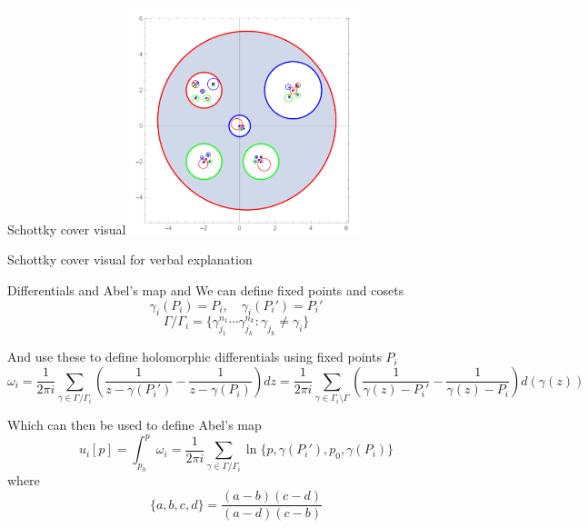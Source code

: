 \documentclass[11pt,aspectratio=169]{beamer}
\begin{document}
\begin{frame}[noframenumbering]{Schottky cover visual}{\tiny \cite{Cha22}}
    \center{}
    \includegraphics[width=0.5\textwidth]{assets/ChanSchottkyCover2.png}

    \tiny Schottky cover visual for verbal explanation

    \cite{Cha22}
\end{frame}

\begin{frame}{Differentials and Abel's map}{\tiny \cite{ComputationalSchottky} and \cite{Cha22}}
    We can define fixed points and cosets
    \[\gamma_i(P_i)=P_i, \quad \gamma_i(P_i')=P_i'\]
    \[\Gamma / \Gamma_i = \{\gamma_{j_1}^{n_1}\cdots \gamma_{j_k}^{n_k}: \gamma_{j_k} \neq \gamma_i\}\]
    
    
    And use these to define holomorphic differentials using fixed points $P_i$
    \[\omega_i = \frac{1}{2\pi i}\sum_{\gamma \in \Gamma / \Gamma_i} \left(\frac{1}{z-\gamma(P_i')} - \frac{1}{z-\gamma(P_i)}\right)dz = \frac{1}{2\pi i}\sum_{\gamma \in \Gamma_i \setminus \Gamma } \left(\frac{1}{\gamma(z)-P_i'} - \frac{1}{\gamma(z)-P_i}\right)d(\gamma(z))\]
    
    
    Which can then be used to define Abel's map
    \[u_i[p] = \int_{p_0}^p \omega_i = \frac{1}{2\pi i} \sum_{\gamma \in \Gamma/\Gamma_i} \ln \{p,\gamma(P_i'),p_0,\gamma(P_i)\}\]
    where
    \[\{a,b,c,d\} = \frac{(a-b)(c-d)}{(a-d)(c-b)}\]
\end{frame}
\end{document}
